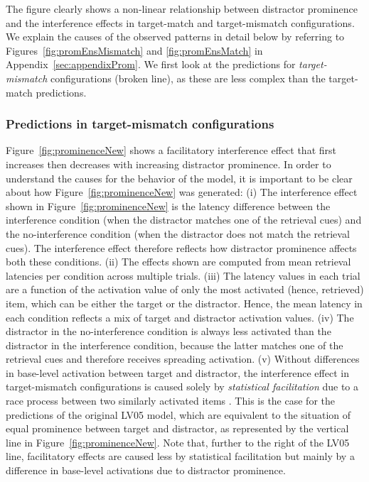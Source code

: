 \documentclass{cambridge7A}\usepackage[]{graphicx}\usepackage[]{color}
\begin{document}
The figure clearly shows a non-linear relationship between distractor prominence and the interference effects in target-match and target-mismatch configurations. We explain the causes of the observed patterns in detail below by referring to Figures~\ref{fig:promEnsMismatch} and \ref{fig:promEnsMatch} in Appendix~\ref{sec:appendixProm}. We first look at the predictions for \emph{target-mismatch} configurations (broken line), as these are less complex than the target-match predictions.

\subsubsection{Predictions in target-mismatch configurations}\label{promexpl}
Figure~\ref{fig:prominenceNew} shows a facilitatory interference effect that first increases then decreases with increasing distractor prominence.
In order to understand the causes for the behavior of the model, it is important to be clear about how Figure~\ref{fig:prominenceNew} was generated: 
(i) The interference effect shown in Figure~\ref{fig:prominenceNew} is the latency difference between the interference condition (when the distractor matches one of the retrieval cues) and the no-interference condition (when the distractor does not match the retrieval cues). The interference effect therefore reflects how distractor prominence affects both these conditions.
(ii) The effects shown are computed from mean retrieval latencies per condition across multiple trials. 
(iii) The latency values in each trial are a function of the activation value of only the most activated (hence, retrieved) item, which can be either the target or the distractor. Hence, the mean latency in each condition reflects a mix of target and distractor activation values.
(iv) The distractor in the no-interference condition is always less activated than the distractor in the interference condition, because the latter matches one of the retrieval cues and therefore receives spreading activation.
(v) Without differences in base-level activation between target and distractor, the interference effect in target-mismatch configurations is caused solely by \emph{statistical facilitation} due to a race process between two similarly activated items \citep{LogacevVasishth2015,raab1962division}.
This is the case for the predictions of the original LV05 model, which are equivalent to the situation of equal prominence between target and distractor, as represented by the vertical line in Figure~\ref{fig:prominenceNew}. 
Note that, further to the right of the LV05 line, facilitatory effects are caused less by statistical facilitation but mainly by a difference in base-level activations due to distractor prominence.
\end{document}
